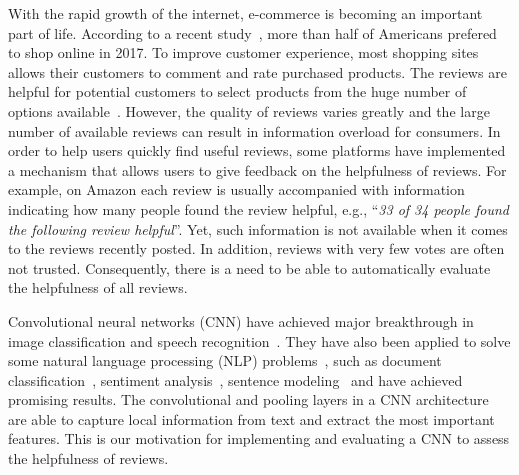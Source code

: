 \documentclass[conference,compsoc]{IEEEtran}
\begin{document}
With the rapid growth of the internet, e-commerce is becoming an important part of life. According to a recent study~\cite{survey1}, more than half of Americans prefered to shop online in 2017. To improve customer experience, most shopping sites allows their customers to comment and rate purchased products. The reviews are helpful for potential customers to select products from the huge number of options available~\cite{Zhu_2010, Mudambi_2010, Baek_2012}. However, the quality of reviews varies greatly and the large number of available reviews can result in information overload for consumers.  In order to help users quickly find useful reviews, some platforms have implemented a mechanism that allows users to give feedback on the helpfulness of reviews. For example, on Amazon each review is usually accompanied with information indicating how many people found the review helpful, e.g., ``\textit{33 of 34 people found the following review helpful}''. Yet, such information is not available when it comes to the reviews recently posted. In addition, reviews with very few votes are often not trusted. Consequently, there is a need to be able to automatically evaluate the helpfulness of all reviews. 


Convolutional neural networks (CNN) have achieved major breakthrough in image classification and speech recognition~\cite{Krizhevsky_2012,Graves_2013}. They have also been applied to solve some natural language processing (NLP) problems~\cite{Goldberg_2015,Moreno_2017}, such as document classification~\cite{NIPS2015_zhang, AAAI159745, Johnson_2015, Yang2016HierarchicalAN, Hoa_2017}, sentiment analysis~\cite{Kim14f}, sentence modeling~\cite{KalchbrennerACL2014, Kim_2016} and have achieved promising results. The convolutional and pooling layers in a CNN architecture are able to capture local information from text and extract the most important features. This is our motivation for implementing and evaluating a CNN to assess the helpfulness of reviews. %
\end{document}
